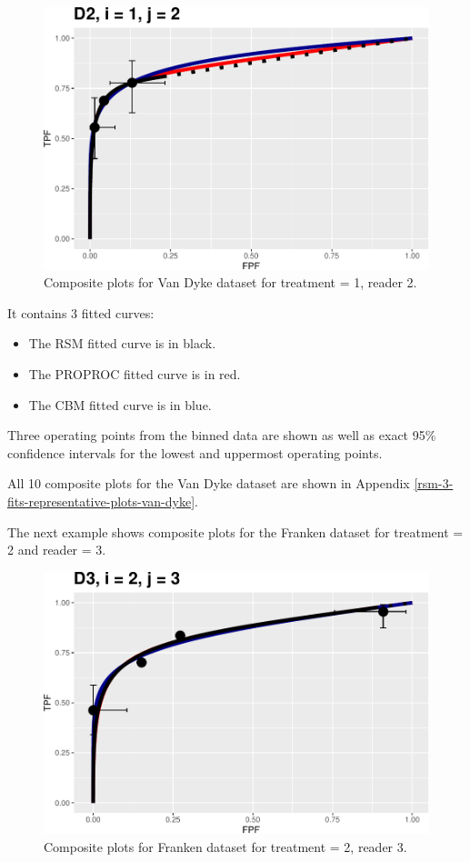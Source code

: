\documentclass[
]{book}
\providecommand{\tightlist}{%
  \setlength{\itemsep}{0pt}\setlength{\parskip}{0pt}}
\begin{document}
\begin{figure}
\centering
\includegraphics{12-rsm-3-fits_files/figure-latex/rsm-3-fits-plots-vd-12-1.pdf}
\caption{\label{fig:rsm-3-fits-plots-vd-12}Composite plots for Van Dyke dataset for treatment = 1, reader 2.}
\end{figure}

It contains 3 fitted curves:

\begin{itemize}
\tightlist
\item
  The RSM fitted curve is in black.
\item
  The PROPROC fitted curve is in red.
\item
  The CBM fitted curve is in blue.
\end{itemize}

Three operating points from the binned data are shown as well as exact 95\% confidence intervals for the lowest and uppermost operating points.

All 10 composite plots for the Van Dyke dataset are shown in Appendix \ref{rsm-3-fits-representative-plots-van-dyke}.

The next example shows composite plots for the Franken dataset for treatment = 2 and reader = 3.

\begin{figure}
\centering
\includegraphics{12-rsm-3-fits_files/figure-latex/rsm-3-fits-plots-fr-23-1.pdf}
\caption{\label{fig:rsm-3-fits-plots-fr-23}Composite plots for Franken dataset for treatment = 2, reader 3.}
\end{figure}
\end{document}
